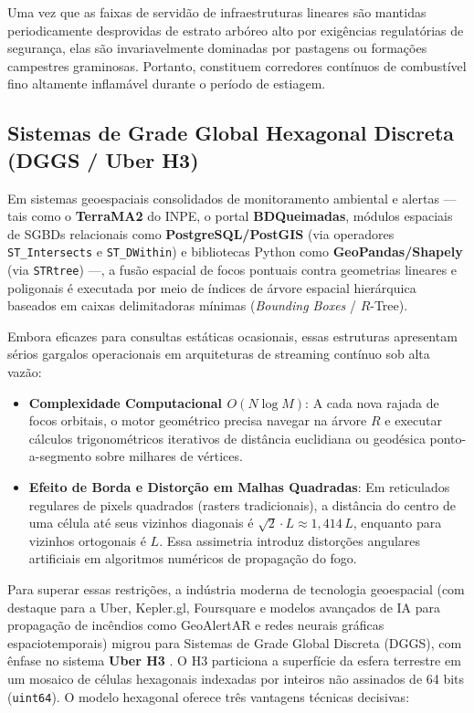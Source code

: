 Uma vez que as faixas de servidão de infraestruturas lineares são mantidas periodicamente desprovidas de estrato arbóreo alto por exigências regulatórias de segurança, elas são invariavelmente dominadas por pastagens ou formações campestres graminosas. Portanto, constituem corredores contínuos de combustível fino altamente inflamável durante o período de estiagem.

\subsection{Sistemas de Grade Global Hexagonal Discreta (DGGS / Uber H3)}
\label{sbc:uber_h3}

Em sistemas geoespaciais consolidados de monitoramento ambiental e alertas — tais como o \textbf{TerraMA2} do INPE, o portal \textbf{BDQueimadas}, módulos espaciais de SGBDs relacionais como \textbf{PostgreSQL/PostGIS} (via operadores \texttt{ST\_Intersects} e \texttt{ST\_DWithin}) e bibliotecas Python como \textbf{GeoPandas/Shapely} (via \texttt{STRtree}) —, a fusão espacial de focos pontuais contra geometrias lineares e poligonais é executada por meio de índices de árvore espacial hierárquica baseados em caixas delimitadoras mínimas (\textit{Bounding Boxes} / $R$-Tree).

Embora eficazes para consultas estáticas ocasionais, essas estruturas apresentam sérios gargalos operacionais em arquiteturas de streaming contínuo sob alta vazão:
\begin{itemize}
    \item \textbf{Complexidade Computacional $O(N \log M)$}: A cada nova rajada de focos orbitais, o motor geométrico precisa navegar na árvore $R$ e executar cálculos trigonométricos iterativos de distância euclidiana ou geodésica ponto-a-segmento sobre milhares de vértices.
    \item \textbf{Efeito de Borda e Distorção em Malhas Quadradas}: Em reticulados regulares de pixels quadrados (rasters tradicionais), a distância do centro de uma célula até seus vizinhos diagonais é $\sqrt{2} \cdot L \approx 1,414\,L$, enquanto para vizinhos ortogonais é $L$. Essa assimetria introduz distorções angulares artificiais em algoritmos numéricos de propagação do fogo.
\end{itemize}

Para superar essas restrições, a indústria moderna de tecnologia geoespacial (com destaque para a Uber, Kepler.gl, Foursquare e modelos avançados de IA para propagação de incêndios como GeoAlertAR e redes neurais gráficas espaciotemporais) migrou para Sistemas de Grade Global Discreta (DGGS), com ênfase no sistema \textbf{Uber H3} \cite{uber_h3_2018}. O H3 particiona a superfície da esfera terrestre em um mosaico de células hexagonais indexadas por inteiros não assinados de 64 bits (\texttt{uint64}). O modelo hexagonal oferece três vantagens técnicas decisivas:

